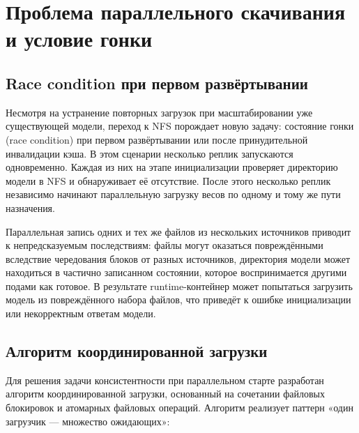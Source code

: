 \section{Проблема параллельного скачивания и условие гонки}

\subsection*{Race condition при первом развёртывании}

Несмотря на устранение повторных загрузок при масштабировании уже существующей модели, переход к NFS порождает новую задачу: состояние гонки (race condition) при первом развёртывании или после принудительной инвалидации кэша. В этом сценарии несколько реплик запускаются одновременно. Каждая из них на этапе инициализации проверяет директорию модели в NFS и обнаруживает её отсутствие. После этого несколько реплик независимо начинают параллельную загрузку весов по одному и тому же пути назначения.

Параллельная запись одних и тех же файлов из нескольких источников приводит к непредсказуемым последствиям: файлы могут оказаться повреждёнными вследствие чередования блоков от разных источников, директория модели может находиться в частично записанном состоянии, которое воспринимается другими подами как готовое. В результате runtime-контейнер может попытаться загрузить модель из повреждённого набора файлов, что приведёт к ошибке инициализации или некорректным ответам модели.

\subsection*{Алгоритм координированной загрузки}

Для решения задачи консистентности при параллельном старте разработан алгоритм координированной загрузки, основанный на сочетании файловых блокировок и атомарных файловых операций. Алгоритм реализует паттерн «один загрузчик --- множество ожидающих»:

